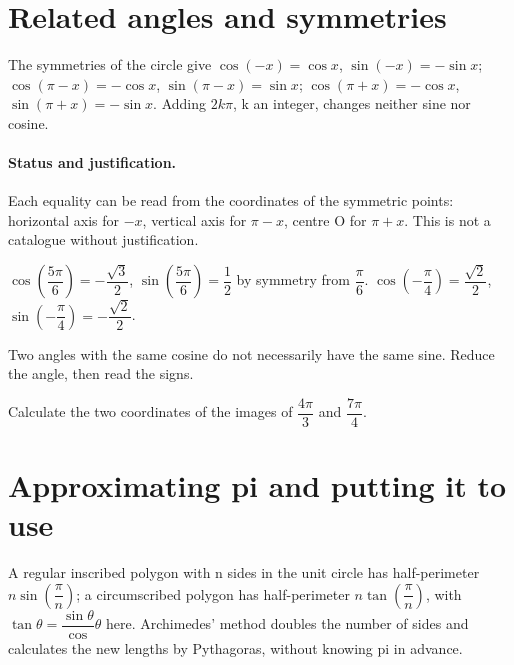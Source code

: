 \section{Related angles and symmetries}\label{C10-U4}
\begin{keypoint}
The symmetries of the circle give $\cos(-x)=\cos x$, $\sin(-x)=-\sin x$; $\cos(\pi-x)=-\cos x$, $\sin(\pi-x)=\sin x$; $\cos(\pi+x)=-\cos x$, $\sin(\pi+x)=-\sin x$. Adding $2k\pi$, k an integer, changes neither sine nor cosine.
\end{keypoint}
\paragraph{Status and justification.} Each equality can be read from the coordinates of the symmetric points: horizontal axis for $-x$, vertical axis for $\pi-x$, centre O for $\pi+x$. This is not a catalogue without justification.
\begin{example}$\cos (\dfrac{5\pi}{6})=-\dfrac{\sqrt 3}{2}$, $\sin (\dfrac{5\pi}{6})=\dfrac{1}{2}$ by symmetry from $\dfrac{\pi}{6}$. $\cos (-\dfrac{\pi}{4})=\dfrac{\sqrt 2}{2}$, $\sin (-\dfrac{\pi}{4})=-\dfrac{\sqrt 2}{2}$.\end{example}\label{C10-EX4}
\begin{pitfall}Two angles with the same cosine do not necessarily have the same sine. Reduce the angle, then read the signs.\end{pitfall}
\begin{application}Calculate the two coordinates of the images of $\dfrac{4\pi}{3}$ and $\dfrac{7\pi}{4}$.\end{application}\label{C10-AP4}
\section{Approximating pi and putting it to use}\label{C10-U5}
\begin{keypoint}
A regular inscribed polygon with n sides in the unit circle has half-perimeter $n\sin (\dfrac{\pi}{n})$; a circumscribed polygon has half-perimeter $n\tan (\dfrac{\pi}{n})$, with $\tan \theta =\dfrac{\sin \theta}{\cos}\theta $ here. Archimedes' method doubles the number of sides and calculates the new lengths by Pythagoras, without knowing pi in advance.
\end{keypoint}
